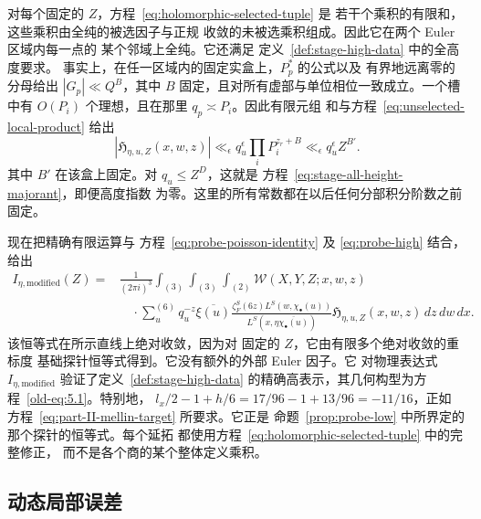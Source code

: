 对每个固定的 $Z$，方程~\eqref{eq:holomorphic-selected-tuple} 是
若干个乘积的有限和，这些乘积由全纯的被选因子与正规
收敛的未被选乘积组成。因此它在两个 Euler 区域内每一点的
某个邻域上全纯。它还满足
定义~\ref{def:stage-high-data} 中的全高度要求。
事实上，在任一区域内的固定实盒上，$P_p^*$ 的公式以及
有界地远离零的分母给出 $|G_p|\ll Q^B$，其中
$B$ 固定，且对所有虚部与单位相位一致成立。一个槽中有
$O(P_i)$ 个理想，且在那里 $q_p\asymp P_i$。因此有限元组
和与方程~\eqref{eq:unselected-local-product} 给出
\begin{equation}\label{eq:compensated-all-height-majorant}
 |\mathfrak H_{\eta,u,Z}(x,w,z)|
 \ll_\epsilon q_u^\epsilon\prod_iP_i^{z_r+B}
 \ll_\epsilon q_u^\epsilon Z^{B'}.
\end{equation}
其中 $B'$ 在该盒上固定。对 $q_u\le Z^D$，这就是
方程~\eqref{eq:stage-all-height-majorant}，即便高度指数
为零。这里的所有常数都在以后任何分部积分阶数之前
固定。

现在把精确有限运算与
方程~\eqref{eq:probe-poisson-identity} 及 \eqref{eq:probe-high}
结合，给出
\begin{equation}\label{eq:compensated-poisson-identity}
\begin{split}
 I_{\eta,\mathrm{modified}}(Z)
 ={}&\frac1{(2\pi i)^3}\int_{(3)}\int_{(3)}\int_{(2)}
       \mathcal W(X,Y,Z;x,w,z)\\
 &\quad\cdot\sum_u^{(6)}q_u^{-z}\overline{\xi(u)}
       \frac{\zeta_F^S(6z)L^S(w,\chi_\bullet(u))}
       {L^S(x,\eta\overline{\chi_\bullet(u)})}
       \mathfrak H_{\eta,u,Z}(x,w,z)\,dz\,dw\,dx.
\end{split}
\end{equation}
该恒等式在所示直线上绝对收敛，因为对
固定的 $Z$，它由有限多个绝对收敛的重标度
基础探针恒等式得到。它没有额外的外部 Euler 因子。它
对物理表达式 $I_{\eta,\mathrm{modified}}$ 验证了定义~\ref{def:stage-high-data}
的精确高表示，其几何构型为方程~\eqref{old-eq:5.1}。特别地，
$l_x/2-1+h/6=17/96-1+13/96=-11/16$，正如
方程~\eqref{eq:part-II-mellin-target} 所要求。它正是
命题~\ref{prop:probe-low} 中所界定的那个探针的恒等式。每个延拓
都使用方程~\eqref{eq:holomorphic-selected-tuple} 中的完整修正，
而不是各个商的某个整体定义乘积。

\subsection{动态局部误差}

